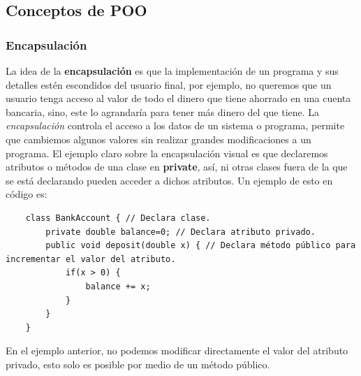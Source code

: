 \subsection{Conceptos de POO}


\subsubsection{Encapsulación}
\hspace{0.55cm}La idea de la \textbf{encapsulación} es que la implementación de un programa y sus detalles estén escondidos del usuario final, por ejemplo, no queremos que un usuario tenga acceso al valor de todo el dinero que tiene ahorrado en una cuenta bancaria, sino, este lo agrandaría para tener más dinero del que tiene. La \textit{encapsulación} controla el acceso a los datos de un sistema o programa, permite que cambiemos algunos valores sin realizar grandes modificaciones a un programa. El ejemplo claro sobre la encapsulación visual es que declaremos atributos o métodos de una clase en \textbf{private}, así, ni otras clases fuera de la que se está declarando pueden acceder a dichos atributos. Un ejemplo de esto en código es:
\begin{lstlisting}
    class BankAccount { // Declara clase.
        private double balance=0; // Declara atributo privado.
        public void deposit(double x) { // Declara método público para incrementar el valor del atributo.
            if(x > 0) {
                balance += x;
            }
        }
    }
\end{lstlisting}

En el ejemplo anterior, no podemos modificar directamente el valor del atributo privado, esto solo es posible por medio de un método público.


